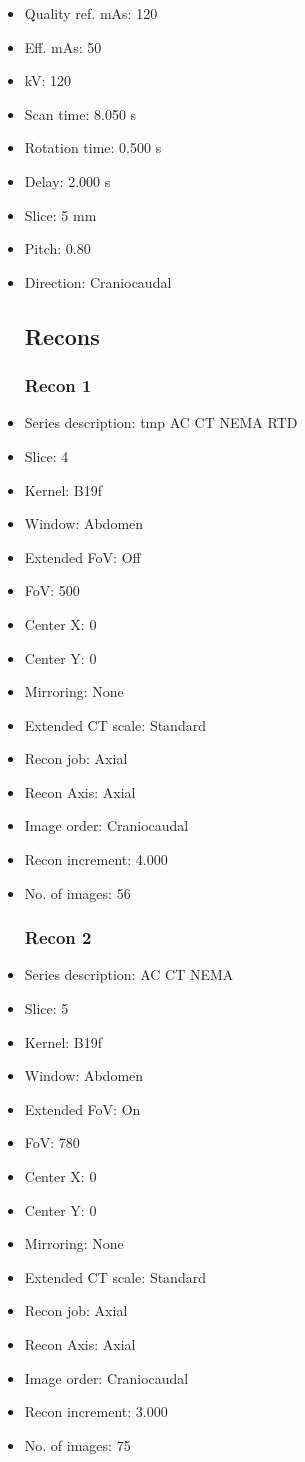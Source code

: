 \documentclass[12pt]{article}
\begin{document}
\begin{itemize}
\subsection{Scan}
\item Quality ref. mAs: 120\item Eff. mAs: 50\item kV: 120\item Scan time: 8.050 s\item Rotation time: 0.500 s\item Delay: 2.000 s\item Slice: 5 mm\item Pitch: 0.80\item Direction: Craniocaudal\subsection{Recons}

\subsubsection{Recon 1}
\item Series description: tmp AC CT NEMA RTD
\item Slice: 4
\item Kernel: B19f
\item Window: Abdomen
\item Extended FoV: Off
\item FoV: 500
\item Center X: 0
\item Center Y: 0
\item Mirroring: None
\item Extended CT scale: Standard
\item Recon job: Axial
\item Recon Axis: Axial
\item Image order: Craniocaudal
\item Recon increment: 4.000
\item No. of images: 56
\subsubsection{Recon 2}
\item Series description: AC CT NEMA
\item Slice: 5
\item Kernel: B19f
\item Window: Abdomen
\item Extended FoV: On
\item FoV: 780
\item Center X: 0
\item Center Y: 0
\item Mirroring: None
\item Extended CT scale: Standard
\item Recon job: Axial
\item Recon Axis: Axial
\item Image order: Craniocaudal
\item Recon increment: 3.000
\item No. of images: 75

\end{itemize}
\end{document}
